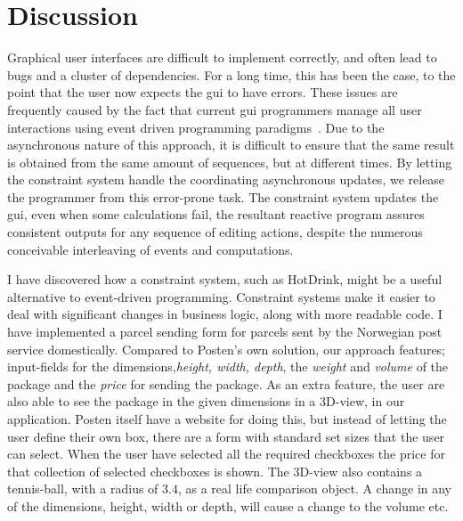 \chapter{Discussion}
\label{chap:discussion}

Graphical user interfaces are difficult to implement correctly, and often lead to bugs and a cluster of dependencies. For a long time, this has been the case, to the point that the user now expects the \gls{gui} to have errors. These issues are frequently caused by the fact that current \gls{gui} programmers manage all user interactions using event driven programming paradigms~\cite{HotDrink}. Due to the asynchronous nature of this approach, it is difficult to ensure that the same result is obtained from the same amount of sequences, but at different times. By letting the constraint system handle the coordinating asynchronous updates, we release the programmer from this error-prone task. The constraint system updates the \gls{gui}, even when some calculations fail, the resultant reactive program assures consistent outputs for any sequence of editing actions, despite the numerous conceivable interleaving of events and computations.

I have discovered how a constraint system, such as HotDrink, might be a useful alternative to event-driven programming. Constraint systems make it easier to deal with significant changes in business logic, along with more readable code. I have implemented a parcel sending form for parcels sent by the Norwegian post service domestically. Compared to Posten's own solution, our approach features; input-fields for the dimensions,\textit{height, width, depth}, the \textit{weight} and \textit{volume} of the package and the \textit{price} for sending the package. As an extra feature, the user are also able to see the package in the given dimensions in a 3D-view, in our application. Posten itself have a website for doing this, but instead of letting the user define their own box, there are a form with standard set sizes that the user can select. When the user have selected all the required checkboxes the price for that collection of selected checkboxes is shown. The 3D-view also contains a tennis-ball, with a radius of $3.4$, as a real life comparison object. A change in any of the dimensions, height, width or depth, will cause a change to the volume etc. 

